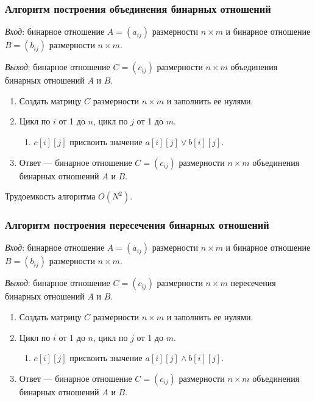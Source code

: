 \documentclass[bachelor, och, labwork]{shiza}
\begin{document}
\subsubsection{Алгоритм построения объединения бинарных отношений}

\textit{Вход}: бинарное отношение $A=(a_{ij})$ размерности $n\times m$ и 
бинарное отношение $B=(b_{ij})$ размерности $n\times m$.

\textit{Выход}: бинарное отношение $C=(c_{ij})$ размерности $n\times m$ объединения
бинарных отношений $A$ и $B$.

\begin{enumerate}
    \item Создать матрицу $C$ размерности $n\times m$ и заполнить ее нулями.
    \item Цикл по $i$ от 1 до $n$, цикл по $j$ от 1 до $m$.
    \begin{enumerate}
        \item $c[i][j]$ присвоить значение $a[i][j] \vee b[i][j]$.
    \end{enumerate}
    \item Ответ --- бинарное отношение $C=(c_{ij})$ размерности $n\times m$ объединения
    бинарных отношений $A$ и $B$.
\end{enumerate}

Трудоемкость алгоритма $O(N^2)$.

\subsubsection{Алгоритм построения пересечения бинарных отношений}

\textit{Вход}: бинарное отношение $A=(a_{ij})$ размерности $n\times m$ и 
бинарное отношение $B=(b_{ij})$ размерности $n\times m$.

\textit{Выход}: бинарное отношение $C=(c_{ij})$ размерности $n\times m$ пересечения
бинарных отношений $A$ и $B$.

\begin{enumerate}
    \item Создать матрицу $C$ размерности $n\times m$ и заполнить ее нулями.
    \item Цикл по $i$ от 1 до $n$, цикл по $j$ от 1 до $m$.
    \begin{enumerate}
        \item $c[i][j]$ присвоить значение $a[i][j] \wedge b[i][j]$.
    \end{enumerate}
    \item Ответ --- бинарное отношение $C=(c_{ij})$ размерности $n\times m$ объединения
    бинарных отношений $A$ и $B$.
\end{enumerate}
\end{document}
